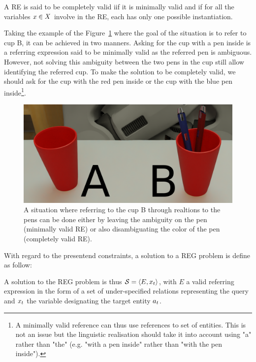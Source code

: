 \begin{theorem} 
\label{the:re_compl_validity}
A RE is said to be completely valid iif it is minimally valid and if for all the variables $x \in X$ involve in the RE, each has only one possible instantiation.
\end{theorem}

Taking the example of the Figure~\ref{fig:chap4_complet} where the goal of the situation is to refer to cup B, it can be achieved in two manners. Asking for the cup with a pen inside is a referring expression said to be minimally valid as the referred pen is ambiguous. However, not solving this ambiguity between the two pens in the cup still allow identifying the referred cup. To make the solution to be completely valid, we should ask for the cup with the red pen inside or the cup with the blue pen inside\footnote{A minimally valid reference can thus use references to set of entities. This is not an issue but the linguistic realisation should take it into account using "a" rather than "the" (e.g. "with a pen inside" rather than "with the pen inside").}.

\begin{figure}[h!]
\centering
\includegraphics[scale=0.15]{figures/chapter4/complet_validity.png}
\caption{\label{fig:chap4_complet} A situation where referring to the cup B through realtions to the pens can be done either by leaving the ambiguity on the pen (minimally valid RE) or also disambiguating the color of the pen (completely valid RE). }
\end{figure}

With regard to the presentend constraints, a solution to a REG problem is define as follow:

\begin{definition}
A solution to the REG problem is thus $\mathcal{S} = \langle E, x_t \rangle$, with $E$ a valid referring expression in the form of a set of under-specified relations representing the \sparql{} query and $x_t$ the variable designating the target entity $a_t$.
\end{definition}



